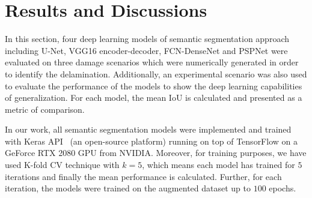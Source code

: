 \section{Results and Discussions}
In this section, four deep learning models  of semantic segmentation approach including U-Net, VGG16 encoder-decoder, FCN-DenseNet and PSPNet were evaluated on three damage scenarios  which were numerically generated in order to identify the delamination.
Additionally, an experimental scenario was also used to evaluate the performance of the models to show the deep learning capabilities of generalization.
For each model, the mean IoU is calculated and presented as a metric of comparison.

In our work, all semantic segmentation models were implemented and trained with Keras API~\cite{chollet2015keras} (an open-source platform) running on top of TensorFlow on a GeForce RTX 2080 GPU from NVIDIA. 
Moreover, for training purposes, we have used K-fold CV technique with \(k=5\), which means each model has trained for \(5\) iterations and finally the mean performance is calculated. 
Further, for each iteration, the models were trained on the augmented dataset up to \(100\) epochs.

